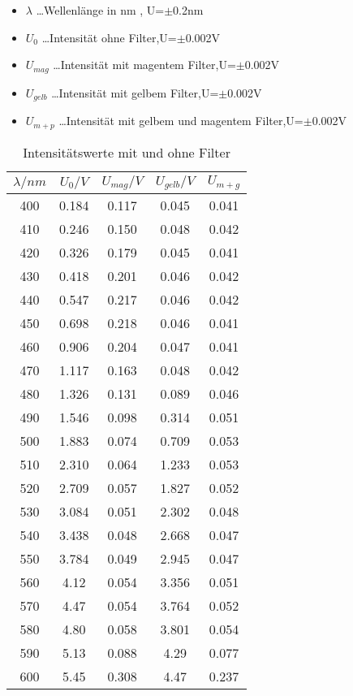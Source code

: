 \documentclass[a4paper]{article}
\begin{document}
\begin{table}[ht]
				\centering
				\caption{Intensitätswerte mit und ohne Filter}
				\begin{itemize}
								\item $\lambda$ \dots Wellenlänge in nm , U=$\pm$0.2nm
								\item $U_0$ \dots Intensität ohne Filter,U=$\pm$0.002V
								\item $U_{mag}$ \dots Intensität mit magentem Filter,U=$\pm$0.002V
								\item $U_{gelb}$ \dots Intensität mit gelbem Filter,U=$\pm$0.002V
								\item $U_{m+p}$ \dots Intensität mit gelbem und magentem Filter,U=$\pm$0.002V
				\end{itemize}
				\begin{tabular}{|c|c|c|c|c|}
								\hline
							$	\lambda/nm$  & $U_0 / V$ & $U_{mag}/V$ & $U_{gelb}/V$ & $U_{m+g}$ \\ \hline
 400 & 0.184 & 0.117 & 0.045 & 0.041 \\ \hline
 410 & 0.246 & 0.150 & 0.048 & 0.042 \\ \hline
 420 & 0.326 & 0.179 & 0.045 & 0.041 \\ \hline
 430 & 0.418 & 0.201 & 0.046 & 0.042 \\ \hline
 440 & 0.547 & 0.217 & 0.046 & 0.042 \\ \hline
 450 & 0.698 & 0.218 & 0.046 & 0.041 \\ \hline
 460 & 0.906 & 0.204 & 0.047 & 0.041 \\ \hline
 470 & 1.117 & 0.163 & 0.048 & 0.042 \\ \hline
 480 & 1.326 & 0.131 & 0.089 & 0.046 \\ \hline
 490 & 1.546 & 0.098 & 0.314 & 0.051 \\ \hline
 500 & 1.883 & 0.074 & 0.709 & 0.053 \\ \hline
 510 & 2.310 & 0.064 & 1.233 & 0.053 \\ \hline
 520 & 2.709 & 0.057 & 1.827 & 0.052 \\ \hline
 530 & 3.084 & 0.051 & 2.302 & 0.048 \\ \hline
 540 & 3.438 & 0.048 & 2.668 & 0.047 \\ \hline
 550 & 3.784 & 0.049 & 2.945 & 0.047 \\ \hline
 560 & 4.12 & 0.054 & 3.356 & 0.051 \\ \hline
 570 & 4.47 & 0.054 & 3.764 & 0.052 \\ \hline
 580 & 4.80 & 0.058 & 3.801 & 0.054 \\ \hline
 590 & 5.13 & 0.088 & 4.29 & 0.077 \\ \hline
 600 & 5.45 & 0.308 & 4.47 & 0.237\\\hline
				\end{tabular}
				\label{tab:1}
\end{table}
\newpage
\end{document}
